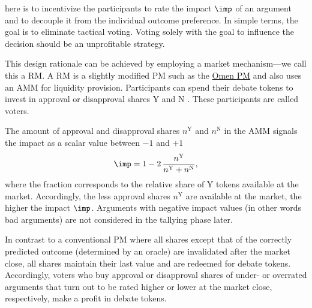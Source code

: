 \documentclass[%
aip,
amsmath,amssymb,
reprint,%
unsortedaddress,
nofootinbib
]{revtex4-2}
\newcommand{\Y}{\text{Y}}
\newcommand{\N}{\text{N}}
\begin{document}
 here is to incentivize the participants to 
rate the impact $\imp$ of an argument and to decouple it from the individual outcome preference. 
In simple terms, the goal is to eliminate tactical voting.
Voting solely with the goal to influence the decision should be an unprofitable strategy.

This design rationale can be achieved by employing a market mechanism---we call this a \ac{RM}.
A \ac{RM} is a slightly modified \ac{PM} such as the \href{https://omen.eth.link/}{Omen \ac{PM}}\cite{Omen2020} and also uses an \ac{AMM}\cite{Zhang2018} for liquidity provision.
Participants can spend their debate tokens to invest in approval or disapproval shares $\Y$ and $\N$
.
These participants are called voters.

The amount of approval and disapproval shares $n^\Y$ and $n^\N$ in the \ac{AMM}
signals the impact as a scalar value between $-1$ and $+1$
\begin{equation}
	\imp = 1-2\,\frac{n^\Y}{n^\Y+n^\N},
\end{equation}
where the fraction corresponds to the relative share of $\Y$ tokens available at the market.
Accordingly, the less approval shares $n^\Y$ are available at the market, the higher the impact $\imp$.
Arguments with negative impact values (in other words bad arguments) are not considered in the tallying phase later.


In contrast to a conventional \ac{PM} where all shares except that of the correctly predicted outcome (determined by an oracle) are invalidated after the market close,
all shares maintain their last value and are redeemed for debate tokens. 
Accordingly, voters who buy approval or disapproval shares of under- or overrated arguments that turn out to be rated higher or lower at the market close, respectively, make a profit in debate tokens.
\end{document}
